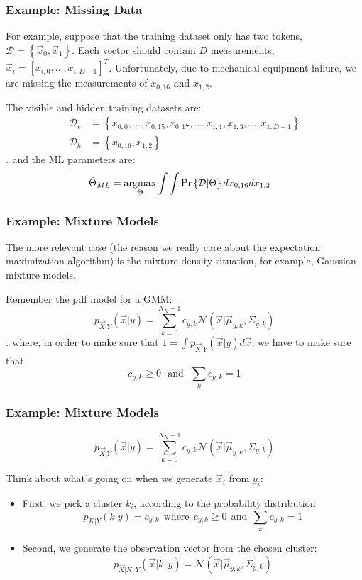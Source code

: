 \documentclass{beamer}
\newcommand{\argmax}{\operatornamewithlimits{argmax}}
\begin{document}
\begin{frame}
  \frametitle{Example: Missing Data}

  For example, suppose that the training dataset only has two tokens,
  ${\mathcal D}=\left\{\vec{x}_0,\vec{x}_1\right\}$.  Each vector
  should contain $D$ measurements,
  $\vec{x}_{i}=[x_{i,0},\ldots,x_{i,D-1}]^T$.  Unfortunately, due to
  mechanical equipment failure, we are missing the measurements of
  $x_{0,16}$ and $x_{1,2}$.

  The visible and hidden training  datasets are:
  \begin{align*}
    {\mathcal D}_v &= \left\{x_{0,0},\ldots,x_{0,15},x_{0,17},\ldots,x_{1,1},x_{1,3},\ldots,x_{1,D-1}\right\}\\
    {\mathcal D}_h &= \left\{x_{0,16},x_{1,2}\right\}
  \end{align*}
  \ldots and the ML parameters are:
  \begin{align*}
    \hat\Theta_{ML}
    &= \argmax_\Theta\int\int
    \Pr\left\{{\mathcal D}|\Theta\right\} dx_{0,16}dx_{1,2}
  \end{align*}
\end{frame}

\begin{frame}
  \frametitle{Example: Mixture Models}

  The more relevant case (the reason we really care about the
  expectation maximization algorithm) is the mixture-density
  situation, for example, Gaussian mixture models.

  Remember the pdf model for a GMM:
  \[
  p_{\vec{X}|Y}(\vec{x}|y) = \sum_{k=0}^{N_K-1}c_{y,k}{\mathcal N}(\vec{x}|\vec\mu_{y,k},\Sigma_{y,k})
  \]
  \ldots where, in order to make sure that $1=\int
  p_{\vec{X}|Y}(\vec{x}|y)d\vec{x}$, we have to make sure that
  \[
  c_{y,k}\ge 0~~~\mbox{and}~~~\sum_k c_{y,k}=1
  \]
\end{frame}

\begin{frame}
  \frametitle{Example: Mixture Models}

  \[
  p_{\vec{X}|Y}(\vec{x}|y) = \sum_{k=0}^{N_K-1}c_{y,k}{\mathcal N}(\vec{x}|\vec\mu_{y,k},\Sigma_{y,k})
  \]

  Think about what's going on when we generate $\vec{x}_i$ from $y_i$:
  \begin{itemize}
  \item First, we pick a cluster $k_i$, according to the probability distribution
    \[
    p_{K|Y}(k|y) = c_{y,k}~~\mbox{where}~~c_{y,k}\ge 0~~\mbox{and}~~\sum_k c_{y,k}=1
    \]
  \item  Second, we generate the observation vector from the chosen cluster:
    \[
    p_{\vec{X}|K,Y}(\vec{x}|k,y) = {\mathcal N}(\vec{x}|\vec\mu_{y,k},\Sigma_{y,k})
    \]
  \end{itemize}
\end{frame}
\end{document}
